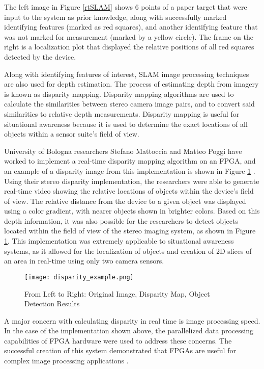 The left image in Figure \ref{rtSLAM} shows 6 points of a paper target that were input to the system as prior knowledge, along with successfully marked identifying features (marked as red squares), and another identifying feature that was not marked for measurement (marked by a yellow circle). The frame on the right is a localization plot that displayed the relative positions of all red squares detected by the device.
\par
Along with identifying features of interest, SLAM image processing techniques are also used for depth estimation. The process of estimating depth from imagery is known as disparity mapping. Disparity mapping algorithms are used to calculate the similarities between stereo camera image pairs, and to convert said similarities to relative depth measurements. Disparity mapping is useful for situational awareness because it is used to determine the exact locations of all objects within a sensor suite's field of view.
\par
University of Bologna researchers Stefano Mattoccia and Matteo Poggi have worked to implement a real-time disparity mapping algorithm on an FPGA, and an example of a disparity image from this implementation is shown in Figure \ref{disparity_example} \cite{mattoccia}. Using their stereo disparity implementation, the researchers were able to generate real-time video showing the relative locations of objects within the device's field of view. The relative distance from the device to a given object was displayed using a color gradient, with nearer objects shown in brighter colors. Based on this depth information, it was also possible for the researchers to detect objects located within the field of view of the stereo imaging system, as shown in Figure \ref{disparity_example}. This implementation was extremely applicable to situational awareness systems, as it allowed for the localization of objects and creation of 2D slices of an area in real-time using only two camera sensors.
\par
\begin{figure}[H]
	\centerline{\texttt{[image: disparity\_example.png]}}
	\caption{From Left to Right: Original Image, Disparity Map, Object Detection Results \cite{mattoccia}}
	\label{disparity_example}
\end{figure}
\par
A major concern with calculating disparity in real time is image processing speed. In the case of the implementation shown above, the parallelized data processing capabilities of FPGA hardware were used to address these concerns. The successful creation of this system demonstrated that FPGAs are useful for complex image processing applications \cite{mattoccia}. 

